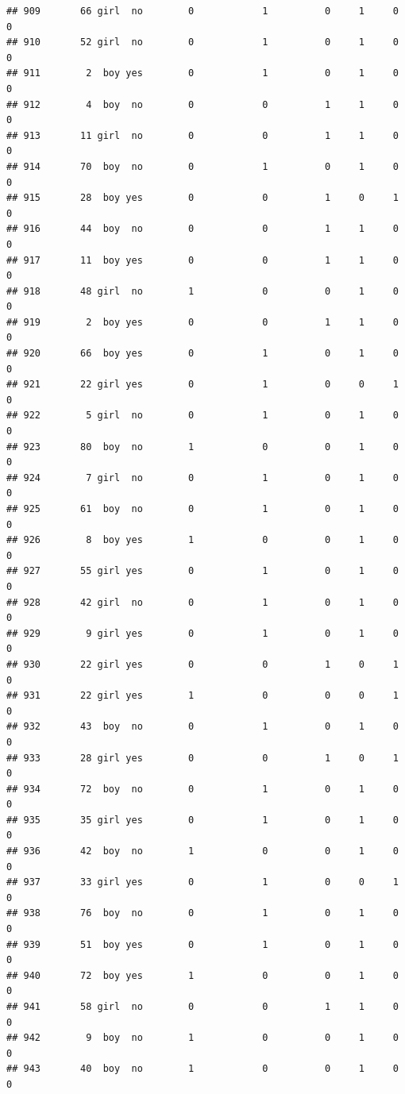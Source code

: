 \documentclass[man]{apa6}
\begin{document}
\begin{verbatim}
## 909       66 girl  no        0            1          0     1     0     0
## 910       52 girl  no        0            1          0     1     0     0
## 911        2  boy yes        0            1          0     1     0     0
## 912        4  boy  no        0            0          1     1     0     0
## 913       11 girl  no        0            0          1     1     0     0
## 914       70  boy  no        0            1          0     1     0     0
## 915       28  boy yes        0            0          1     0     1     0
## 916       44  boy  no        0            0          1     1     0     0
## 917       11  boy yes        0            0          1     1     0     0
## 918       48 girl  no        1            0          0     1     0     0
## 919        2  boy yes        0            0          1     1     0     0
## 920       66  boy yes        0            1          0     1     0     0
## 921       22 girl yes        0            1          0     0     1     0
## 922        5 girl  no        0            1          0     1     0     0
## 923       80  boy  no        1            0          0     1     0     0
## 924        7 girl  no        0            1          0     1     0     0
## 925       61  boy  no        0            1          0     1     0     0
## 926        8  boy yes        1            0          0     1     0     0
## 927       55 girl yes        0            1          0     1     0     0
## 928       42 girl  no        0            1          0     1     0     0
## 929        9 girl yes        0            1          0     1     0     0
## 930       22 girl yes        0            0          1     0     1     0
## 931       22 girl yes        1            0          0     0     1     0
## 932       43  boy  no        0            1          0     1     0     0
## 933       28 girl yes        0            0          1     0     1     0
## 934       72  boy  no        0            1          0     1     0     0
## 935       35 girl yes        0            1          0     1     0     0
## 936       42  boy  no        1            0          0     1     0     0
## 937       33 girl yes        0            1          0     0     1     0
## 938       76  boy  no        0            1          0     1     0     0
## 939       51  boy yes        0            1          0     1     0     0
## 940       72  boy yes        1            0          0     1     0     0
## 941       58 girl  no        0            0          1     1     0     0
## 942        9  boy  no        1            0          0     1     0     0
## 943       40  boy  no        1            0          0     1     0     0

\end{verbatim}
\end{document}
